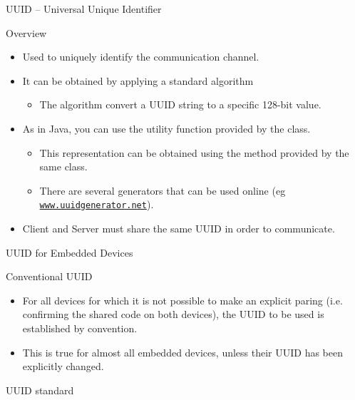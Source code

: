 \documentclass{beamer}
\begin{document}
  \begin{frame}{UUID -- Universal Unique Identifier}
    \begin{block}{Overview}
      \begin{itemize}
        \item Used to uniquely identify the communication channel.
        \item It can be obtained by applying a standard algorithm
        \begin{itemize}
          \item The algorithm convert a UUID string to a specific 128-bit value.
        \end{itemize}
        \item As in Java, you can use the  utility
        function provided by the  class.
        \begin{itemize}
          \item This representation can be obtained using the 
          method provided by the same class.
          \item There are several generators that can be used online (eg
          \texttt{\url{www.uuidgenerator.net}}).
        \end{itemize}
        \item Client and Server must share the same UUID in order to communicate.
      \end{itemize}
    \end{block}
  \end{frame}

  \begin{frame}{UUID for Embedded Devices}
    \begin{block}{Conventional UUID}
      \begin{itemize}\itemsep10pt
        \item For all devices for which it is not possible to make an explicit
        paring (i.e. confirming the shared code on both devices), the UUID to be
        used is established by convention.
        \item This is true for almost all embedded devices, unless their UUID
        has been explicitly changed. 
      \end{itemize}
    \end{block}
    \begin{block}{UUID standard}
      \centering{}
    \end{block}
  \end{frame}
\end{document}
